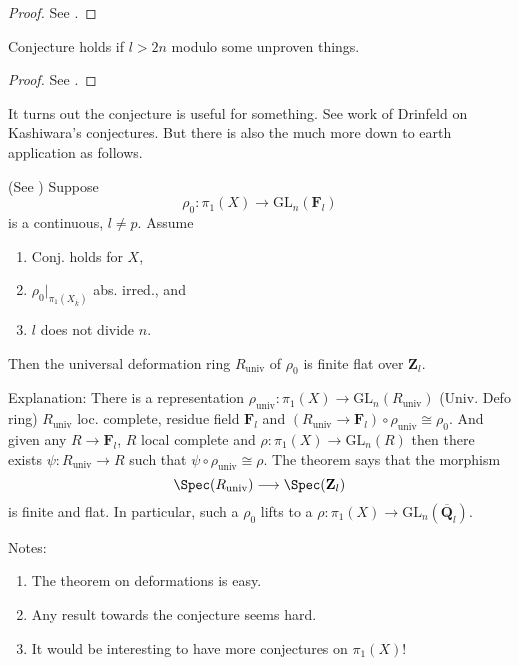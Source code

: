 \begin{proof}
See \cite{dJ-conjecture}.
\end{proof}

\begin{theorem}
\label{theorem-conjecture-l-bigger-2n}
Conjecture holds if $l>2n$ modulo some unproven things.
\end{theorem}

\begin{proof}
See \cite{Gaitsgory}.
\end{proof}

\noindent
It turns out the conjecture is useful for something.
See work of Drinfeld on Kashiwara's conjectures. But there is also
the much more down to earth application as follows.

\begin{theorem}
\label{theorem-deformation-rings}
(See \cite[Theorem 3.5]{dJ-conjecture})
Suppose
$$
\rho_0: \pi_1(X)\to \text{GL}_n(\mathbf{F}_l)
$$
is a continuous, $l\neq p$. Assume
\begin{enumerate}
\item Conj. holds for $X$,
\item $\rho_0 |_{\pi_1(X_{\overline{k}})}$ abs. irred., and
\item $l$ does not divide $n$.
\end{enumerate}
Then the universal deformation ring $R_{\text{univ}}$ of $\rho_0$ is
finite flat over $\mathbf{Z}_l$.
\end{theorem}

\noindent
Explanation: There is a representation $\rho_{\text{univ}}:
\pi_1(X)\to \text{GL}_n(R_{\text{univ}})$ (Univ. Defo ring)
$R_{\text{univ}}$ loc.
complete, residue field $\mathbf{F}_l$ and $(R_{\text{univ}}\to
\mathbf{F}_l)\circ\rho_{\text{univ}}\cong\rho_0$.
And given any $R\to \mathbf{F}_l$, $R$ local complete and
$\rho : \pi_1(X)\to \text{GL}_n(R)$ then there exists
$\psi : R_{\text{univ}}\to R$ such that
$\psi\circ\rho_{\text{univ}}\cong \rho$. The theorem says that the morphism
$$
\Spec(R_{\text{univ}})
\longrightarrow
\Spec(\mathbf{Z}_l)
$$
is finite and flat. In particular, such a $\rho_0$
lifts to a $\rho : \pi_1(X) \to \text{GL}_n(\overline{\mathbf{Q}}_l)$.

\medskip\noindent
Notes:
\begin{enumerate}
\item The theorem on deformations is easy.
\item Any result towards the conjecture seems hard.
\item It would be interesting to have more conjectures on $\pi_1(X)$!
\end{enumerate}




